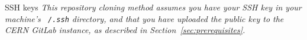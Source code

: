 \begin{warningbox}{SSH keys}
\emph{This repository cloning method assumes you have your \ac{SSH} key in your
machine's \texttt{~/.ssh} directory, and that you have uploaded the
public key to the CERN GitLab instance, as described in
Section~\ref{sec:prerequisites}.}
\end{warningbox}

\clearpage



\clearpage



